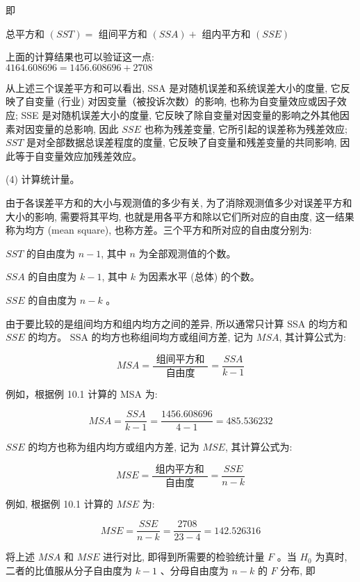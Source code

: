 \documentclass[10pt]{article}
\begin{document}
\begin{CJK*}{UTF8}{bsmi}
即

总平方和 $(S S T)=$ 组间平方和 $(S S A)+$ 组内平方和 $(S S E)$

上面的计算结果也可以验证这一点:\\
$4164.608696=1456.608696+2708$

从上述三个误差平方和可以看出, SSA 是对随机误差和系统误差大小的度量, 它反映了自变量 (行业) 对因变量（被投诉次数）的影响, 也称为自变量效应或因子效应; SSE 是对随机误差大小的度量, 它反映了除自变量对因变量的影响之外其他因素对因变量的总影响, 因此 $S S E$ 也称为残差变量, 它所引起的误差称为残差效应; $S S T$ 是对全部数据总误差程度的度量, 它反映了自变量和残差变量的共同影响, 因此等于自变量效应加残差效应。

(4) 计算统计量。

由于各误差平方和的大小与观测值的多少有关, 为了消除观测值多少对误差平方和大小的影响, 需要将其平均, 也就是用各平方和除以它们所对应的自由度, 这一结果称为均方 (mean square), 也称方差。三个平方和所对应的自由度分别为:

$S S T$ 的自由度为 $n-1$, 其中 $n$ 为全部观测值的个数。

$S S A$ 的自由度为 $k-1$, 其中 $k$ 为因素水平 (总体) 的个数。

$S S E$ 的自由度为 $n-k$ 。

由于要比较的是组间均方和组内均方之间的差异, 所以通常只计算 SSA 的均方和 $S S E$ 的均方。 SSA 的均方也称组间均方或组间方差, 记为 $M S A$, 其计算公式为:


\begin{equation*}
M S A=\frac{\text { 组间平方和 }}{\text { 自由度 }}=\frac{S S A}{k-1} \tag{10.7}
\end{equation*}


例如，根据例 10.1 计算的 MSA 为:

$$
M S A=\frac{S S A}{k-1}=\frac{1456.608696}{4-1}=485.536232
$$

$S S E$ 的均方也称为组内均方或组内方差, 记为 $M S E$, 其计算公式为:


\begin{equation*}
M S E=\frac{\text { 组内平方和 }}{\text { 自由度 }}=\frac{S S E}{n-k} \tag{10.8}
\end{equation*}


例如, 根据例 10.1 计算的 $M S E$ 为:

$$
M S E=\frac{S S E}{n-k}=\frac{2708}{23-4}=142.526316
$$

将上述 $M S A$ 和 $M S E$ 进行对比, 即得到所需要的检验统计量 $F$ 。当 $H_{0}$ 为真时, 二者的比值服从分子自由度为 $k-1$ 、分母自由度为 $n-k$ 的 $F$ 分布, 即



\end{CJK*}
\end{document}

